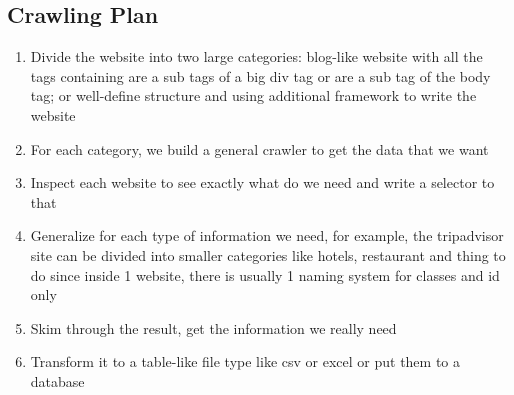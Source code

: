 \documentclass[11pt,a4paper]{report}
\begin{document}
\subsection{Crawling Plan}
\begin{enumerate}
	\item Divide the website into two large categories: blog-like website with all the tags containing  are a sub tags of a big div tag or are a sub tag of the body tag; or well-define structure and using additional framework to write the website
	\item For each category, we build a general crawler to get the data that we want
	\item Inspect each website to see exactly what do we need and write a selector to that
	\item Generalize for each type of information we need, for example, the tripadvisor site can be divided into smaller categories like hotels, restaurant and thing to do since inside 1 website, there is usually 1 naming system for classes and id only
	\item Skim through the result, get the information we really need
	\item Transform it to a table-like file type like csv or excel or put them to a database
\end{enumerate}
\end{document}
